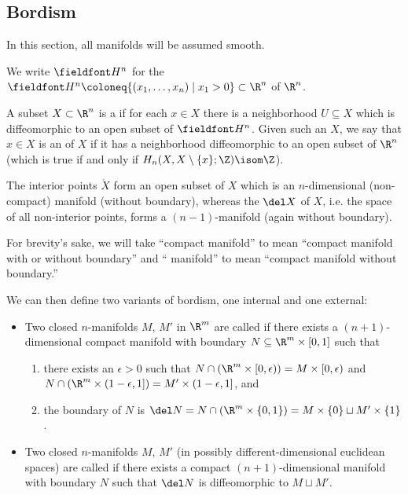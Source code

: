 \subsection{Bordism}
\begin{note}
	In this section, all manifolds will be assumed smooth.
\end{note}
We write $\H^n$ for the  $\H^n \coloneq \{(x_1, \ldots, x_n) \mid x_1 > 0\} \subset \R^n$ of $\R^n$.
\begin{definition}
	A subset $X \subset \R^n$ is a  if for each $x \in X$ there is a neighborhood $U \subseteq X$ which is diffeomorphic to an open subset of $\H^n$.
	Given such an $X$, we say that $x \in X$ is an  of $X$ if it has a neighborhood diffeomorphic to an open subset of $\R^n$ (which is true if and only if $H_n(X, X \setminus \{x\}; \Z) \isom \Z$).

	The interior points $\mathring{X}$ form an open subset of $X$ which is an $n$-dimensional (non-compact) manifold (without boundary), whereas the  $\del X$ of $X$, i.e. the space of all non-interior points, forms a $(n - 1)$-manifold (again without boundary).
\end{definition}
For brevity's sake, we will take \enquote{compact manifold} to mean \enquote{compact manifold with or without boundary} and \enquote{ manifold} to mean \enquote{compact manifold without boundary.}

We can then define two variants of bordism, one internal and one external:
\begin{definition}
	\leavevmode
	\begin{itemize}
		\item Two closed $n$-manifolds $M$, $M'$ in $\R^m$ are called  if there exists a $(n + 1)$-dimensional compact manifold with boundary $N \subseteq \R^m \times [0, 1]$ such that
			\begin{enumerate}
				\item there exists an $\epsilon > 0$ such that $N \cap (\R^m \times [0, \epsilon)) = M \times [0, \epsilon)$ and $N \cap (\R^m \times (1 - \epsilon, 1]) = M' \times (1 - \epsilon, 1]$, and
				\item the boundary of $N$ is $\del N = N \cap (\R^m \times \{0, 1\}) = M \times \{0\} \sqcup M' \times \{1\}$.
			\end{enumerate}
		\item Two closed $n$-manifolds $M$, $M'$ (in possibly different-dimensional euclidean spaces) are called  if there exists a compact $(n + 1)$-dimensional manifold with boundary $N$ such that $\del N$ is diffeomorphic to $M \sqcup M'$.
	\end{itemize}
\end{definition}

